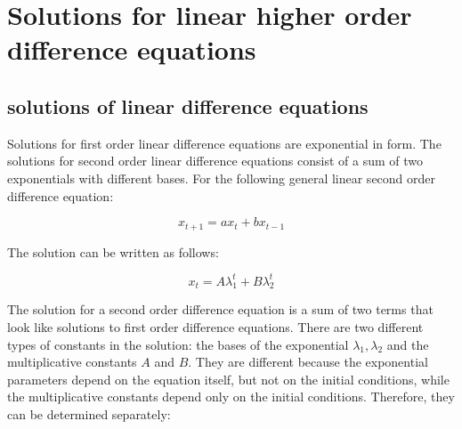 \documentclass[
  letterpaper,
  DIV=11,
  numbers=noendperiod]{scrreprt}
\begin{document}
\hypertarget{solutions-for-linear-higher-order-difference-equations}{%
\section{Solutions for linear higher order difference
equations}\label{solutions-for-linear-higher-order-difference-equations}}

\hypertarget{solutions-of-linear-difference-equations}{%
\subsection{solutions of linear difference
equations}\label{solutions-of-linear-difference-equations}}

Solutions for first order linear difference equations are exponential in
form. The solutions for second order linear difference equations consist
of a sum of two exponentials with different bases. For the following
general linear second order difference equation:

\[
x_{t+1} = ax_{t} + b x_{t-1}
\]

The solution can be written as follows:

\[
x_t  = A \lambda_1^t + B \lambda_2^t
\]

The solution for a second order difference equation is a sum of two
terms that look like solutions to first order difference equations.
There are two different types of constants in the solution: the bases of
the exponential \(\lambda_1, \lambda_2\) and the multiplicative
constants \(A\) and \(B\). They are different because the exponential
parameters depend on the equation itself, but not on the initial
conditions, while the multiplicative constants depend only on the
initial conditions. Therefore, they can be determined separately:
\end{document}
